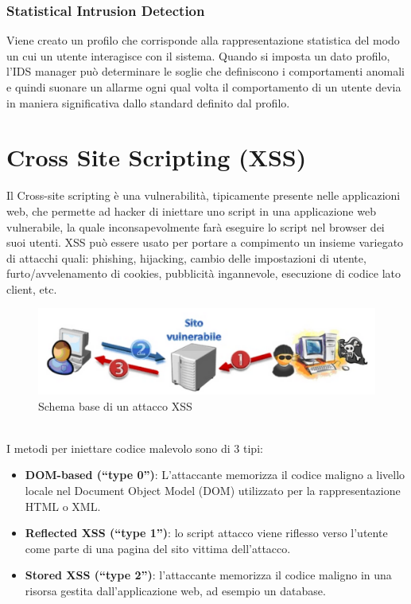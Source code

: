 \subsubsection{Statistical Intrusion Detection}
Viene creato un profilo che corrisponde alla rappresentazione statistica del modo un cui un utente interagisce con il sistema. Quando si imposta un dato profilo, l'IDS manager può determinare le soglie che definiscono i comportamenti anomali e quindi suonare un allarme ogni qual volta il comportamento di un utente devia in maniera significativa dallo standard definito dal profilo.

\section{Cross Site Scripting (XSS)}
Il Cross-site scripting è una vulnerabilità, tipicamente presente nelle applicazioni web, che permette ad hacker di iniettare uno script in una applicazione web vulnerabile, la quale inconsapevolmente farà eseguire lo script nel browser dei suoi utenti. XSS può essere usato per portare a compimento un insieme variegato di attacchi quali: phishing, hijacking, cambio delle impostazioni di utente, furto/avvelenamento di cookies, pubblicità ingannevole, esecuzione di codice lato client, etc. 
\begin{figure}[htbp]
	\centering
	\includegraphics[width=0.5\linewidth]{Immagini/firewalls/XSS.png}
	\caption{Schema base di un attacco XSS} 	
	\label{fig:XSS_attack}
\end{figure}
\\
I metodi per iniettare codice malevolo sono di 3 tipi:
\begin{itemize}
	\item \textbf{DOM-based (“type 0”)}: 	L'attaccante memorizza il codice maligno a livello locale nel Document Object Model (DOM) utilizzato per la rappresentazione HTML o XML.
	\item \textbf{Reflected XSS (“type 1”)}: lo script attacco viene riflesso verso l'utente come parte di una pagina del sito vittima dell'attacco.
	\item \textbf{Stored XSS (“type 2”)}: l'attaccante memorizza il codice maligno in una risorsa gestita dall'applicazione web, ad esempio un database.
\end{itemize}
